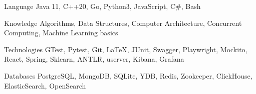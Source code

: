 

\begin{cvskills}

  \cvskill
    {Language} %
    {Java 11, C++20, Go, Python3, JavaScript, C\#, Bash} %

  \cvskill
    {Knowledge} %
    {Algorithms, Data Structures, Computer Architecture, Concurrent Computing, Machine Learning basics} %

  \cvskill
    {Technologies} %
    {GTest, Pytest, Git, \LaTeX, JUnit, Swagger, Playwright, Mockito, React, Spring, Sklearn, ANTLR, userver, Kibana, Grafana} %

  \cvskill
    {Databases} %
    {PostgreSQL, MongoDB, SQLite, YDB, Redis, Zookeeper, ClickHouse, ElasticSearch, OpenSearch} %

\end{cvskills}
